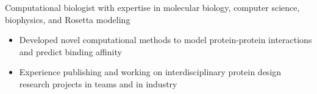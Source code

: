 
Computational biologist with expertise in molecular biology, computer science, biophysics, and Rosetta modeling
\begin{itemize}
\item Developed novel computational methods to model protein-protein interactions and predict binding affinity
\item Experience publishing and working on interdisciplinary protein design research projects in teams and in industry
\end{itemize}
